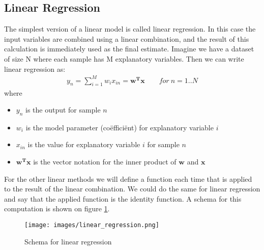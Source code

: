 \subsection{Linear Regression}
The simplest version of a linear model is called linear regression\cite{caltechmachinelearning}\cite{wikilinearregression}. In this case the input variables are combined using a linear combination, and the result of this calculation is immediately used as the final estimate. Imagine we have a dataset of size N where each sample has M explanatory variables. Then we can write linear regression as:\\
\begin{equation}
\begin{split}
y_{n} = \sum_{i=1}^{M}w_{i}x_{in} = \bm{w^{T}x}   \qquad for\ n=1..N
\end{split}
\end{equation}
where
\begin{itemize}
	\item $y_{n}$ is the output for sample $n$
	\item $w_{i}$ is the model parameter (co\"effici\"ent) for explanatory variable $i$
	\item $x_{in}$ is the value for explanatory variable $i$ for sample $n$
	\item $\bm{w^{T}x}$ is the vector notation for the inner product of $\bm{w}$ and $\bm{x}$
\end{itemize}
For the other linear methods we will define a function each time that is applied to the result of the linear combination. We could do the same for linear regression and say that the applied function is the identity function. A schema for this computation is shown on figure \ref{fig:glm-linear-regression}.\\
\begin{figure}
	\centering
	\texttt{[image: images/linear\_regression.png]}
	\caption{Schema for linear regression}
	\label{fig:glm-linear-regression}
\end{figure}
